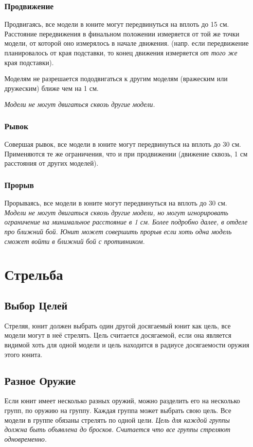 \documentclass[twocolumn]{article}
\begin{document}
\subsubsection{Продвижение}
Продвигаясь, все модели в юните могут передвинуться на вплоть до 15 см. Расстояние передвижения в финальном положении измеряется от той же точки модели, от которой оно измерялось в начале движения. (напр. если передвижение планировалось от края подставки, то конец движения измеряется \emph{от того же} края подставки).

Моделям не разрешается пододвигаться к другим моделям (вражеским или дружеским) ближе чем на 1 см.

\emph{Модели не могут двигаться сквозь другие модели.}

\subsubsection{Рывок}
Совершая рывок, все модели в юните могут передвинуться на вплоть до 30 см. Применяются те же ограничения, что и при продвижении (движение сквозь, 1 см расстояния от других моделей).

\subsubsection{Прорыв}
Прорываясь, все модели в юните могут передвинуться на вплоть до 30 см. \emph{Модели не могут двигаться сквозь другие модели, но могут игнорировать ограничение на минимальное расстояние в 1 см. Более подробно далее, в отделе про ближний бой. Юнит может совершить прорыв если хоть одна модель сможет войти в ближний бой с противником.}

\newpage

\section{Стрельба}
\subsection{Выбор Целей}
Стреляя, юнит должен выбрать один другой досягаемый юнит как цель, все модели могут в неё стрелять.
Цель считается досягаемой, если она является видимой хоть для одной модели и цель находится в радиусе досягаемости оружия этого юнита.
\subsection{Разное Оружие}
Если юнит имеет несколько разных оружий, можно разделить его на несколько групп, по оружию на группу. Каждая группа может выбрать свою цель. Все модели в группе обязаны стрелять по одной цели. \emph{Цель для каждой группы должна быть объявлена до бросков. Считается что все группы стреляют одновременно.}
\end{document}
